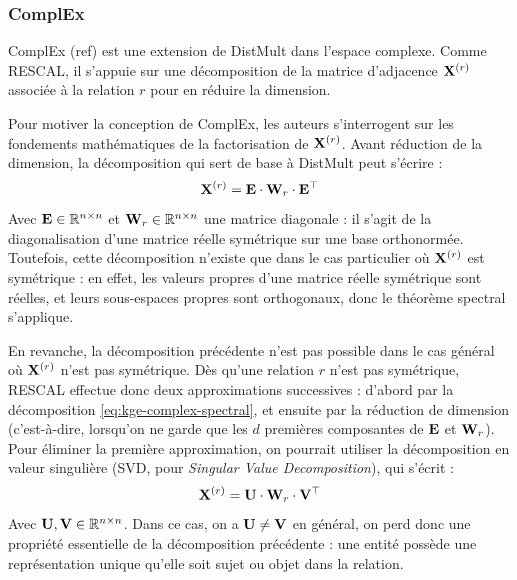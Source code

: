 \subsubsection{ComplEx}
\label{subsec:complex}

ComplEx (ref) est une extension de DistMult dans l'espace complexe. Comme RESCAL, il s'appuie sur une décomposition de la matrice d'adjacence $\bf{X}^{(r)}$ associée à la relation $r$ pour en réduire la dimension.

Pour motiver la conception de ComplEx, les auteurs s'interrogent sur les fondements mathématiques de la factorisation de $\bf{X}^{(r)}$. Avant réduction de la dimension, la décomposition qui sert de base à DistMult peut s'écrire :
\begin{equation}
    \bf{X}^{(r)} = \bf{E} \cdot \bf{W}_r \cdot \bf{E}^\top
    \label{eq:kge-complex-spectral}
\end{equation}
Avec $\bf{E} \in \R^{n \times n}$ et $\bf{W}_r \in \R^{n \times n}$ une matrice diagonale : il s'agit de la diagonalisation d'une matrice réelle symétrique sur une base orthonormée. Toutefois, cette décomposition n'existe que dans le cas particulier où $\bf{X}^{(r)}$ est symétrique : en effet, les valeurs propres d'une matrice réelle symétrique sont réelles, et leurs sous-espaces propres sont orthogonaux, donc le théorème spectral s'applique.

En revanche, la décomposition précédente n'est pas possible dans le cas général où $\bf{X}^{(r)}$ n'est pas symétrique. Dès qu'une relation $r$ n'est pas symétrique, RESCAL effectue donc deux approximations successives : d'abord par la décomposition \ref{eq:kge-complex-spectral}, et ensuite par la réduction de dimension (c'est-à-dire, lorsqu'on ne garde que les $d$ premières composantes de $\bf{E}$ et $\bf{W}_r$). Pour éliminer la première approximation, on pourrait utiliser la décomposition en valeur singulière (SVD, pour \textit{Singular Value Decomposition}), qui s'écrit :
\begin{equation}
    \bf{X}^{(r)} = \bf{U} \cdot \bf{W}_r \cdot \bf{V}^\top
\end{equation}
Avec $\bf{U}, \bf{V} \in \R^{n \times n}$. Dans ce cas, on a $\bf{U \neq V}$ en général, on perd donc une propriété essentielle de la décomposition précédente : une entité possède une représentation unique qu'elle soit sujet ou objet dans la relation. 

